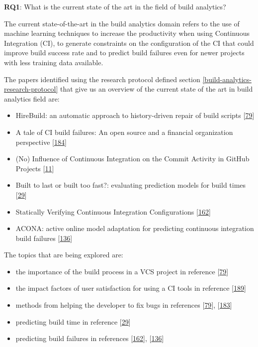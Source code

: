 \documentclass[]{book}
\providecommand{\tightlist}{%
  \setlength{\itemsep}{0pt}\setlength{\parskip}{0pt}}
\begin{document}
\textbf{RQ1}: What is the current state of the art in the field of build
analytics?

The current state-of-the-art in the build analytics domain refers to the
use of machine learning techniques to increase the productivity when
using Continuous Integration (CI), to generate constraints on the
configuration of the CI that could improve build success rate and to
predict build failures even for newer projects with less training data
available.

The papers identified using the research protocol defined section
\ref{build-analytics-research-protocol} that give us an overview of the
current state of the art in build analytics field are:

\begin{itemize}
\tightlist
\item
  HireBuild: an automatic approach to history-driven repair of build
  scripts {[}\protect\hyperlink{ref-hassan2018hirebuild}{79}{]}
\item
  A tale of CI build failures: An open source and a financial
  organization perspective
  {[}\protect\hyperlink{ref-vassallo2017tale}{184}{]}
\item
  (No) Influence of Continuous Integration on the Commit Activity in
  GitHub Projects {[}\protect\hyperlink{ref-baltes2018no}{11}{]}
\item
  Built to last or built too fast?: evaluating prediction models for
  build times {[}\protect\hyperlink{ref-bisong2017built}{29}{]}
\item
  Statically Verifying Continuous Integration Configurations
  {[}\protect\hyperlink{ref-santolucito2018statically}{162}{]}
\item
  ACONA: active online model adaptation for predicting continuous
  integration build failures
  {[}\protect\hyperlink{ref-ni2018acona}{136}{]}
\end{itemize}

The topics that are being explored are:

\begin{itemize}
\tightlist
\item
  the importance of the build process in a VCS project in reference
  {[}\protect\hyperlink{ref-hassan2018hirebuild}{79}{]}
\item
  the impact factors of user satisfaction for using a CI tools in
  reference {[}\protect\hyperlink{ref-widder2018m}{189}{]}
\item
  methods from helping the developer to fix bugs in references
  {[}\protect\hyperlink{ref-hassan2018hirebuild}{79}{]},
  {[}\protect\hyperlink{ref-vassallo2018break}{183}{]}
\item
  predicting build time in reference
  {[}\protect\hyperlink{ref-bisong2017built}{29}{]}
\item
  predicting build failures in references
  {[}\protect\hyperlink{ref-santolucito2018statically}{162}{]},
  {[}\protect\hyperlink{ref-ni2018acona}{136}{]}
\end{itemize}
\end{document}
